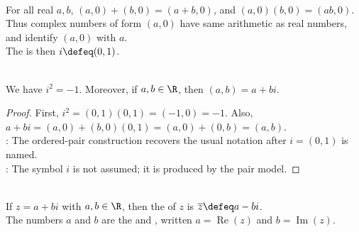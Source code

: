 \begin{proposition} \label{prop:real-field-embedded-in-complex-field} \\
For all real $a,b$, $(a,0)+(b,0)=(a+b,0)$, and $(a,0)(b,0)=(ab,0)$.\\
Thus complex numbers of form $(a,0)$ have same arithmetic as real numbers, and identify $(a,0)$ with $a$.\\
The  is then $i\defeq(0,1)$.
\end{proposition}

\begin{proposition} \label{prop:complex-unit-and-coordinate-form} \\
We have $i^2=-1$. Moreover, if $a,b\in\R$, then $(a,b)=a+bi$.
\begin{proof}
First, $i^2=(0,1)(0,1)=(-1,0)=-1$. Also, $a+bi=(a,0)+(b,0)(0,1)=(a,0)+(0,b)=(a,b)$.\\
: The ordered-pair construction recovers the usual notation after $i=(0,1)$ is named.\\
: The symbol $i$ is not assumed; it is produced by the pair model.
\end{proof}
\end{proposition}

\begin{definition} \label{def:complex-conjugate-real-imaginary-parts} \\
If $z=a+bi$ with $a,b\in\R$, then the  of $z$ is $\overline{z}\defeq a-bi$.\\
The numbers $a$ and $b$ are the  and , written $a=\operatorname{Re}(z)$ and $b=\operatorname{Im}(z)$.
\end{definition}

